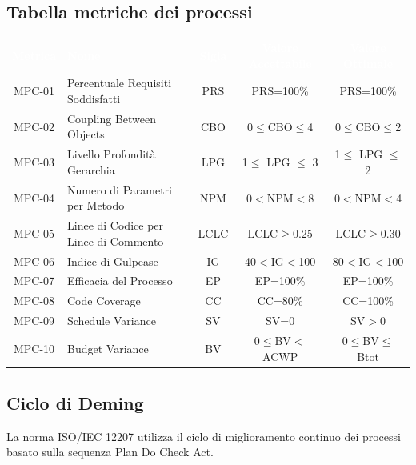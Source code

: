 \newpage
\subsection{Tabella metriche dei processi}
    \renewcommand{\arraystretch}{1.5}
    \begin{longtable}{ c C{4cm} c c c}
    \textcolor{white}{\textbf{Metrica}} & \textcolor{white}{\textbf{Nome}} & \textcolor{white}{\textbf{Sigla}} & \textcolor{white}{\textbf{Valore Accettabile}} & \textcolor{white}{\textbf{Valore Ottimale}}\\
    MPC-01 & Percentuale Requisiti Soddisfatti & PRS & PRS=100\% & PRS=100\% \\
    MPC-02 & Coupling Between Objects & CBO & 0$\leq$CBO$\leq$4 & 0$\leq$CBO$\leq$2 \\
    MPC-03 & Livello Profondità Gerarchia & LPG &  1$\leq$ LPG $\leq$ 3 &  1$\leq$ LPG $\leq$ 2\\
    MPC-04 & Numero di Parametri per Metodo & NPM & 0$<$NPM$<$8 & 0$<$NPM$<$4 \\
    MPC-05 & Linee di Codice per Linee di Commento & LCLC & LCLC$\geq$0.25 & LCLC$\geq$0.30 \\
    MPC-06 & Indice di Gulpease & IG & 40$<$IG$<$100 & 80$<$IG$<$100 \\
    MPC-07 & Efficacia del Processo & EP & EP=100\% & EP=100\%  \\
    MPC-08 & Code Coverage & CC & CC=80\% & CC=100\%  \\
    MPC-09 & Schedule Variance & SV & SV=0 & SV$>$0  \\	
    MPC-10 & Budget Variance & BV & 0$\leq$BV$<$ACWP  & 0$\leq$BV$\leq$Btot  \\	

    \end{longtable}

\subsection{Ciclo di Deming}
    La norma ISO/IEC 12207 utilizza il ciclo di miglioramento continuo dei processi basato sulla sequenza Plan Do Check Act.

